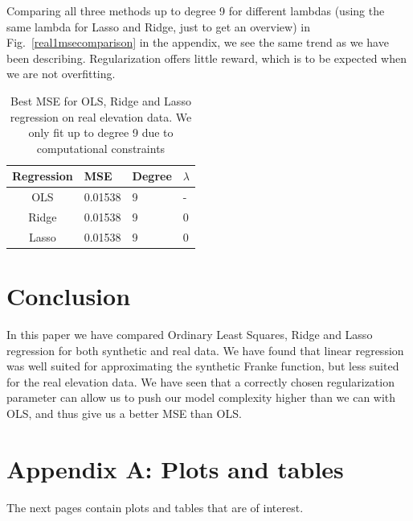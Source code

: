 \documentclass[twocolumn,10pt,cleanfoot]{asme2ej}
\begin{document}
Comparing all three methods up to degree 9 for different lambdas (using the same lambda for Lasso and Ridge, just to get an overview) in Fig.~\ref{real1msecomparison} in the appendix, we see the same trend as we have been describing. Regularization offers little reward, which is to be expected when we are not overfitting.


\begin{table}[t]
\caption{Best MSE for OLS, Ridge and Lasso regression on real elevation data. We only fit up to degree 9 due to computational constraints}
\begin{center}
\label{ols_vs_ridge_vs_lasso_table_real}
\begin{tabular}{c | l l l}
Regression & MSE & Degree & $\lambda$ \\
\hline
OLS & 0.01538 & 9 & - \\
Ridge & 0.01538 & 9 & 0 \\
Lasso & 0.01538 & 9 & 0 \\
\hline
\end{tabular}
\end{center}
\end{table}

\section{Conclusion}

In this paper we have compared Ordinary Least Squares, Ridge and Lasso regression for both synthetic and real data. We have found that linear regression was well suited for approximating the synthetic Franke function, but less suited for the real elevation data. We have seen that a correctly chosen regularization parameter can allow us to push our model complexity higher than we can with OLS, and thus give us a better MSE than OLS.




\section*{Appendix A: Plots and tables}

The next pages contain plots and tables that are of interest.
\end{document}
